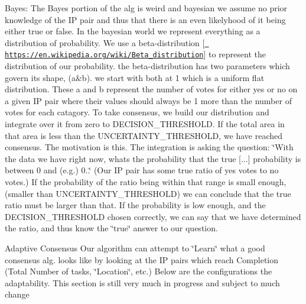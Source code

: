 Bayes\+: The Bayes portion of the alg is weird and bayesian we assume no prior knowledge of the IP pair and thus that there is an even likelyhood of it being either true or false. In the bayesian world we represent everything as a distribution of probability. We use a beta-\/distribution \mbox{[}\href{https://en.wikipedia.org/wiki/Beta_distribution}{\texttt{ https\+://en.\+wikipedia.\+org/wiki/\+Beta\+\_\+distribution}}\mbox{]} to represent the distribution of our probability. the beta-\/distribution has two parameters which govern its shape, (a\&b). we start with both at 1 which is a uniform flat distribution. These a and b represent the number of votes for either yes or no on a given IP pair where their values should always be 1 more than the number of votes for each catagory. To take consensus, we build our distribution and integrate over it from zero to D\+E\+C\+I\+S\+I\+O\+N\+\_\+\+T\+H\+R\+E\+S\+H\+O\+LD. If the total area in that area is less than the U\+N\+C\+E\+R\+T\+A\+I\+N\+T\+Y\+\_\+\+T\+H\+R\+E\+S\+H\+O\+LD, we have reached consensus. The motivation is this. The integration is asking the question\+: \char`\"{}\+With the data we have right now, what\textquotesingle{}s the probability that the true \mbox{[}...\mbox{]}
     probability is between 0 and (e.\+g.) 0..\char`\"{} (Our IP pair has some true ratio of yes votes to no votes.) If the probability of the ratio being within that range is small enough, (smaller than U\+N\+C\+E\+R\+T\+A\+I\+N\+T\+Y\+\_\+\+T\+H\+R\+E\+S\+H\+O\+LD) we can conclude that the true ratio must be larger than that. If the probability is low enough, and the D\+E\+C\+I\+S\+I\+O\+N\+\_\+\+T\+H\+R\+E\+S\+H\+O\+LD chosen correctly, we can say that we have determined the ratio, and thus know the \char`\"{}true\char`\"{} answer to our question.

Adaptive Consensus Our algorithm can attempt to \char`\"{}\+Learn\char`\"{} what a good consensus alg. looks like by looking at the IP pairs which reach Completion (Total Number of tasks, \char`\"{}\+Location\char`\"{}, etc.) Below are the configurations the adaptability. This section is still very much in progress and subject to much change 